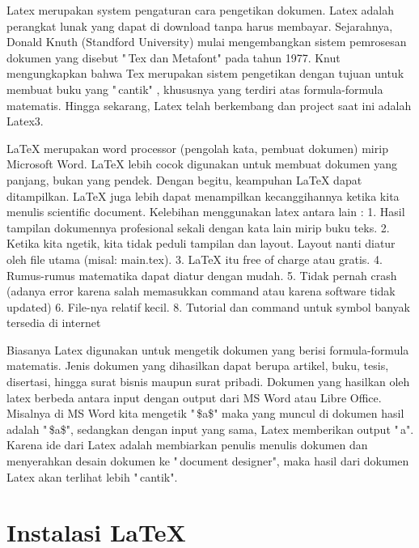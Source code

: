 \hspace{0,5in}Latex merupakan system pengaturan cara pengetikan dokumen. Latex adalah perangkat lunak yang dapat di download tanpa harus membayar. Sejarahnya, Donald Knuth (Standford University) mulai mengembangkan sistem pemrosesan dokumen yang disebut "\,Tex dan Metafont" pada tahun 1977. Knut mengungkapkan bahwa Tex merupakan sistem pengetikan dengan tujuan
untuk membuat buku yang "\,cantik" , khususnya yang terdiri atas formula-formula matematis. Hingga sekarang, Latex telah berkembang dan project saat ini adalah Latex3.\par \vspace{12pt}

LaTeX merupakan word processor (pengolah kata, pembuat dokumen) mirip Microsoft Word. LaTeX lebih cocok digunakan untuk membuat dokumen yang panjang, bukan yang pendek. Dengan begitu, keampuhan LaTeX dapat ditampilkan. LaTeX juga lebih dapat menampilkan kecanggihannya ketika kita menulis scientific document.
Kelebihan menggunakan latex antara lain :
1.  Hasil tampilan dokumennya profesional sekali dengan kata lain mirip buku teks.
2.  Ketika kita ngetik, kita tidak peduli tampilan dan layout. Layout nanti diatur oleh file utama (misal: main.tex).
3.  LaTeX itu free of charge atau gratis.
4.  Rumus-rumus matematika dapat diatur dengan mudah.
5.  Tidak pernah crash (adanya error karena salah memasukkan command atau karena software tidak updated)
6.  File-nya relatif kecil.
8.  Tutorial dan command untuk symbol banyak tersedia di internet

\hspace{0,3in}Biasanya Latex digunakan untuk mengetik dokumen yang berisi formula-formula matematis. Jenis dokumen yang dihasilkan dapat berupa artikel, buku, tesis, disertasi, hingga surat bisnis maupun surat pribadi. Dokumen yang hasilkan oleh latex berbeda antara input dengan output dari MS Word atau Libre Office. Misalnya di MS Word kita mengetik "\,\$a\$" maka yang muncul di dokumen hasil adalah "\,\$a\$", sedangkan dengan input yang sama, Latex memberikan output "\,a". Karena ide dari Latex adalah membiarkan penulis menulis dokumen dan menyerahkan desain dokumen ke "\,document designer", maka hasil dari dokumen Latex akan terlihat lebih "\,cantik".\par \vspace{12pt}

\section{Instalasi LaTeX}\par \vspace{8pt}

